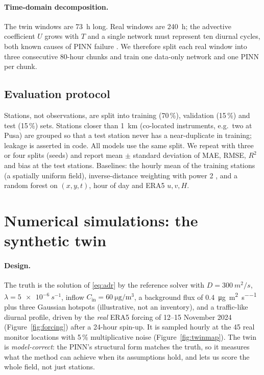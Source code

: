 \documentclass[11pt,a4paper]{article}
\begin{document}
\paragraph{Time-domain decomposition.} The twin windows are 73~h long. Real windows are 240~h; the advective
coefficient $U$ grows with $T$ and a single network must represent ten diurnal cycles, both known causes of PINN
failure \citep{krishnapriyan2021}. We therefore split each real window into three consecutive 80-hour chunks and
train one data-only network and one PINN per chunk.

\subsection{Evaluation protocol}
Stations, not observations, are split into training (70\,\%), validation (15\,\%) and test (15\,\%) sets. Stations
closer than \SI{1}{km} (co-located instruments, e.g.\ two at Pusa) are grouped so that a test station never has a
near-duplicate in training; leakage is asserted in code. All models use the same split. We repeat with three or four
splits (seeds) and report mean $\pm$ standard deviation of MAE, RMSE, $R^2$ and bias at the test stations. Baselines:
the hourly mean of the training stations (a spatially uniform field), inverse-distance weighting with power 2
\citep{shepard1968}, and a random forest \citep{breiman2001} on $(x,y,t)$, hour of day and ERA5 $u,v,H$.

\section{Numerical simulations: the synthetic twin}
\label{sec:twin}
\paragraph{Design.} The truth is the solution of \eqref{eq:adr} by the reference solver with $D=\SI{300}{m^2/s}$,
$\lambda=\SI{5e-6}{s^{-1}}$, inflow $C_{\mathrm{in}}=\SI{60}{\micro\gram\per\metre\cubed}$, a background flux of
\SI{0.4}{\micro\gram\per\metre\squared\per\second} plus three Gaussian hotspots (illustrative, not an inventory), and a
traffic-like diurnal profile, driven by the \emph{real} ERA5 forcing of 12--15 November 2024 (Figure~\ref{fig:forcing})
after a 24-hour spin-up. It is sampled hourly at the 45 real monitor locations with 5\,\% multiplicative noise
(Figure~\ref{fig:twinmap}). The twin is \emph{model-correct}: the PINN's structural form matches the truth, so it
measures what the method can achieve when its assumptions hold, and lets us score the whole field, not just stations.
\end{document}
